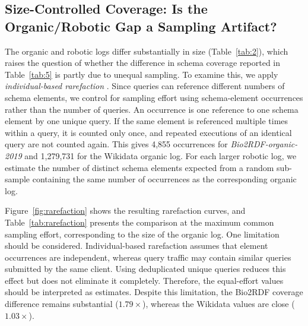 \documentclass[sw]{iosart2x}
\begin{document}
\subsection{Size-Controlled Coverage: Is the Organic/Robotic Gap a Sampling Artifact?}\label{sec:rarefaction}
The organic and robotic logs differ substantially in size (Table~\ref{tab:2}), which raises the question of whether the difference in schema coverage reported in Table~\ref{tab:5} is partly due to unequal sampling. To examine this, we apply \emph{individual-based rarefaction} \cite{hurlbert1971nonconcept}. Since queries can reference different numbers of schema elements, we control for sampling effort using schema-element occurrences rather than the number of queries. An occurrence is one reference to one schema element by one unique query. If the same element is referenced multiple times within a query, it is counted only once, and repeated executions of an identical query are not counted again. This gives 4{,}855 occurrences for \emph{Bio2RDF-organic-2019} and 1{,}279{,}731 for the Wikidata organic log. For each larger robotic log, we estimate the number of distinct schema elements expected from a random sub-sample containing the same number of occurrences as the corresponding organic log.


Figure~\ref{fig:rarefaction} shows the resulting rarefaction curves, and Table~\ref{tab:rarefaction} presents the comparison at the maximum common sampling effort, corresponding to the size of the organic log. One limitation should be considered. Individual-based rarefaction assumes that element occurrences are independent, whereas query traffic may contain similar queries submitted by the same client. Using deduplicated unique queries reduces this effect but does not eliminate it completely. Therefore, the equal-effort values should be interpreted as estimates. Despite this limitation, the Bio2RDF coverage difference remains substantial ($1.79\times$), whereas the Wikidata values are close ($1.03\times$).

\end{document}
